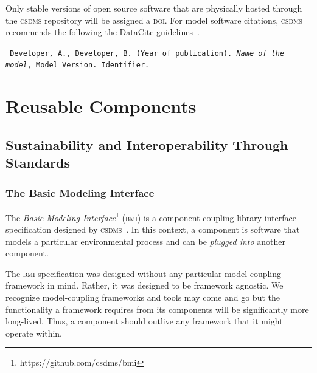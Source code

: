 \documentclass[11pt, oneside]{amsart}
\DeclareRobustCommand{\csdms}{\textsc{csdms}}
\DeclareRobustCommand{\doi}{\textsc{doi}}
\DeclareRobustCommand{\bmi}{\textsc{bmi}}
\begin{document}

Only stable versions of open source
software that are physically hosted through the \csdms{} repository will be
assigned a \doi{}. For model software citations, \csdms{} recommends the
following the DataCite guidelines~\cite{brase2009datacite}.

\begin{shaded}
\leftskip 0.25in
\parindent -0.25in
\tt{
Developer, A., Developer, B. (Year of publication). \emph{Name of the model},
Model Version. Identifier.
}
\end{shaded}

\section{Reusable Components}
\label{sec:reusable}

\subsection{Sustainability and Interoperability Through Standards}
\label{sec:standards}

\subsubsection{The Basic Modeling Interface}
\label{sec:bmi}

The \emph{Basic Modeling Interface}\footnote{https://github.com/csdms/bmi}
(\bmi{}) is a component-coupling library
interface specification designed by \csdms~\cite{peckham2012component,
syvitski2014plug}.  In this context, a component is software that models a
particular environmental process and can be \emph{plugged into} another
component.

The \bmi{} specification was designed without any particular model-coupling
framework in mind.  Rather, it was designed to be framework agnostic. We
recognize model-coupling frameworks and tools may come and go but the
functionality a framework requires from its components will be significantly
more long-lived. Thus, a component should outlive any framework that it might
operate within.
\end{document}
